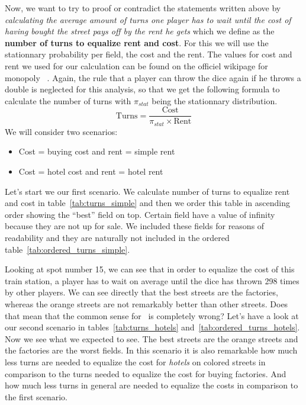 Now, we want to try to proof or contradict the statements written above by \emph{calculating the average 
amount of turns one player has to wait until the cost of having bought the street pays off by the rent he 
gets} which we define as the \textbf{number of turns to equalize rent and cost}. For this we will use the stationnary probability per field, the cost and the rent. 
The values for cost and rent we used for our calculation can be found on the officiel wikipage for monopoly 
~\cite{wiki:monopolyRules}. Again, the rule 
that a player can throw the dice again if he throws a double is neglected for this analysis, so that we get 
the following formula to calculate the number of turns with $\pi_{stat}$ being the stationnary distribution.
\[
\text{Turns} = \frac{\text{Cost}}{\pi_{stat} \times \text{Rent}}
\]
We will consider two scenarios:
\begin{itemize}
	\item Cost = buying cost and rent = simple rent
	\item Cost = hotel cost and rent = hotel rent
\end{itemize}

Let's start we our first scenario.
We calculate number of turns to equalize rent and cost in table~\ref{tab:turns_simple} 
and then we order this table in ascending order showing the ``best'' field on top. 
Certain field have a value of infinity because they are not up for sale. We included these fields for 
reasons of readability and they are naturally not included in
the ordered table~\ref{tab:ordered_turns_simple}.

Looking at spot number 15, we can see that in order to equalize the cost of this train station, a player 
has to wait on average until the dice has thrown 298 times by other players.
We can see directly that the best streets are the factories, whereas the orange streets are not remarkably 
better than other streets. Does that mean that the common sense for \monopoly~is completely wrong?
Let's have a look at our second scenario in tables~\ref{tab:turns_hotels} and~\ref{tab:ordered_turns_hotels}.
Now we see what we expected to see. The best streets are the orange streets and the factories are the worst 
fields. In this scenario it is also remarkable how much less turns are needed to equalize the cost for 
\emph{hotels} on colored streets in comparison to the turns needed to equalize the cost for buying factories. And 
how much less turns in general are needed to equalize the costs in comparison to the first scenario.


